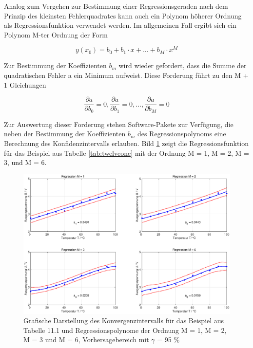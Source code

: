 \noindent Analog zum Vergehen zur Bestimmung einer Regressionsgeraden nach dem Prinzip des kleinsten Fehlerquadrates kann auch ein Polynom h\"{o}herer Ordnung als Regressionsfunktion verwendet werden. Im allgemeinen Fall ergibt sich ein Polynom M-ter Ordnung der Form 

\begin{equation}\label{eq:twelveonehundredfive}
y(x_{0} )=b_{0} +b_{1} \cdot x+...+b_{M} \cdot x^{M}
\end{equation}

\noindent Zur Bestimmung der Koeffizienten $b_{m}$ wird wieder gefordert, dass die Summe der quadratischen Fehler a ein Minimum aufweist. Diese Forderung f\"{u}hrt zu den M + 1 Gleichungen

\begin{equation}\label{eq:twelveonehundredsix}
\dfrac{\partial a}{\partial b_{0}} =0, \dfrac{\partial a}{\partial b_{1}} =0,\dots , \dfrac{\partial a}{\partial b_{M}} =0
\end{equation}

\noindent Zur Auswertung dieser Forderung stehen Software-Pakete zur Verf\"{u}gung, die neben der Bestimmung der Koeffizienten $b_{m}$ des Regressionspolynoms eine Berechnung des Konfidenzintervalls erlauben. Bild \ref{fig:RegressionLinearOeltemperatur7} zeigt die Regressionsfunktion f\"{u}r das Beispiel aus Tabelle \ref{tab:twelveone} mit der Ordnung M = 1, M = 2, M = 3, und M = 6.

\noindent 
\begin{figure}[H]
  \centerline{\includegraphics[width=1\textwidth]{Kapitel12/Bilder/image10}}
  \caption{Grafische Darstellung des Konvergenzintervalls f\"{u}r das Beispiel aus Tabelle 11.1 und Regressionspolynome der Ordnung M = 1, M = 2, M = 3 und M = 6, Vorhersagebereich mit $\gamma$ = 95 \%}
  \label{fig:RegressionLinearOeltemperatur7}
\end{figure}

